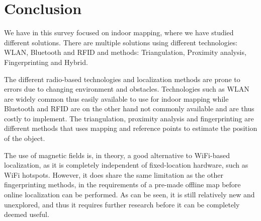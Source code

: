 \section{Conclusion}
We have in this survey focused on indoor mapping, where we have studied different solutions.
There are multiple solutions using different technologies: WLAN, Bluetooth and RFID and methods: Triangulation, Proximity analysis, Fingerprinting and Hybrid.

The different radio-based technologies and localization methods are prone to errors due to changing environment and obstacles.
Technologies such as WLAN are widely common thus easily available to use for indoor mapping while Bluetooth and RFID are on the other hand not commonly available and are thus costly to implement.
The triangulation, proximity analysis and fingerprinting are different methods that uses mapping and reference points to estimate the position of the object.

The use of magnetic fields is, in theory, a good alternative to WiFi-based localization, as it is completely independent of fixed-location hardware, such as WiFi hotspots.
However, it does share the same limitation as the other fingerprinting methods, in the requirements of a pre-made offline map before online localization can be performed.
As can be seen, it is still relatively new and unexplored, and thus it requires further research before it can be completely deemed useful.
